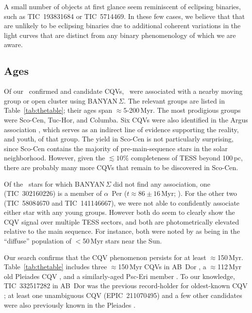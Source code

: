 \documentclass[11pt,twocolumn,tighten]{aastex63}
\begin{document}
A small number of objects at first glance seem reminiscent of
eclipsing binaries, such as TIC~193831684 or TIC~5714469.  In these
few cases, we believe that that are unlikely to be eclipsing binaries
due to additional coherent variations in the light curves that are
distinct from any binary phenomenology of which we are aware.


\subsection{Ages}

Of our \ncpvsfound\ confirmed and candidate CQVs, \nnotfieldbanyan\
were associated with a nearby moving group or open cluster using
BANYAN\,$\Sigma$.  The relevant groups are listed in
Table~\ref{tab:thetable}; their ages span $\approx$5-200\,Myr.  The
most prodigious groups were Sco-Cen, Tuc-Hor, and Columba.  Six CQVs
were also identified in the Argus association
\citep{2019ApJ...870...27Z}, which serves as an indirect line of
evidence supporting the reality, and youth, of that group.  The yield
in Sco-Cen is not particularly surprising, since Sco-Cen contains the
majority of pre-main-sequence stars in the solar neighborhood.
However, given the $\lesssim$$10\%$ completeness of TESS beyond
100\,pc, there are probably many more CQVs that remain to be
discovered in Sco-Cen.  


Of the \ngoodsfieldbanyan\ stars for which BANYAN\,$\Sigma$ did not
find any association, one (TIC~302160226) is a member of $\alpha$~Per
($t\approx 86\pm16$\,Myr;
\citealt{2021A&A...645A..84M,2023AJ....166...14B}).  For the other two
(TIC~58084670 and TIC~141146667), we were not able to confidently
associate either star with any young groups.  However both do seem to
clearly show the CQV signal over multiple TESS sectors, and both are
photometrically elevated relative to the main sequence.  For instance,
both were noted by \citet{2021ApJ...917...23K} as being in the
``diffuse'' population of $<$50\,Myr stars near the Sun.  

Our search confirms that the CQV phenomenon persists for at least
$\approx$150\,Myr.  Table~\ref{tab:thetable} includes three
$\approx$150\,Myr CQVs in AB~Dor \citep{2015MNRAS.454..593B}, a
$\approx$112\,Myr old Pleiades CQV \citep{2015ApJ...813..108D}, and a
similarly-aged Psc-Eri member \citep{2020A&A...639A..64R}.  To our
knowledge, TIC~332517282 in AB~Dor was the previous record-holder for
oldest-known CQV \citep{2019ApJ...876..127Z,2022AJ....163..144G}; at
least one unambiguous CQV (EPIC~211070495) and a few other candidates
were also previously known in the Pleiades
\citep{2016AJ....152..114R}.  
\end{document}
